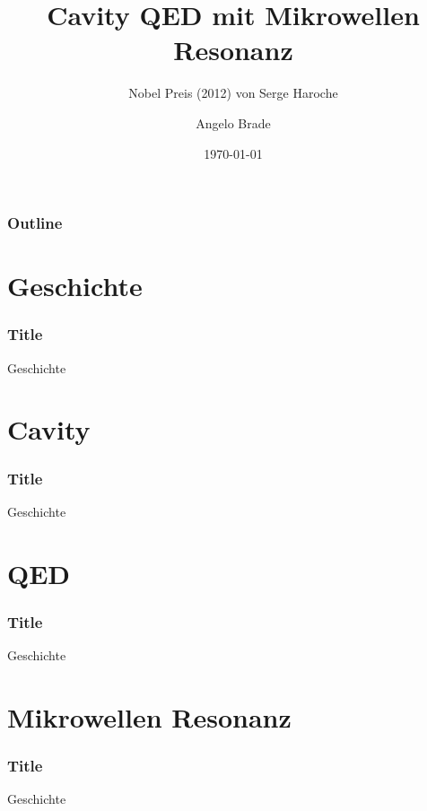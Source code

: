 \documentclass{beamer}
\title{Cavity QED mit Mikrowellen Resonanz}
\subtitle{Nobel Preis (2012) von Serge Haroche}
\author{Angelo Brade}
\institute{University of Bonn}
\date{\today}
\begin{document}
\begin{frame}
\titlepage
\end{frame}
\begin{frame}
\frametitle{Outline}
\tableofcontents
\end{frame}

\section{Geschichte}
\begin{frame}
\frametitle{Title}
Geschichte
\end{frame}
\section{Cavity}
\begin{frame}
\frametitle{Title}
Geschichte
\end{frame}
\section{QED}
\begin{frame}
\frametitle{Title}
Geschichte
\end{frame}
\section{Mikrowellen Resonanz}
\begin{frame}
\frametitle{Title}
Geschichte
\end{frame}
\end{document}
